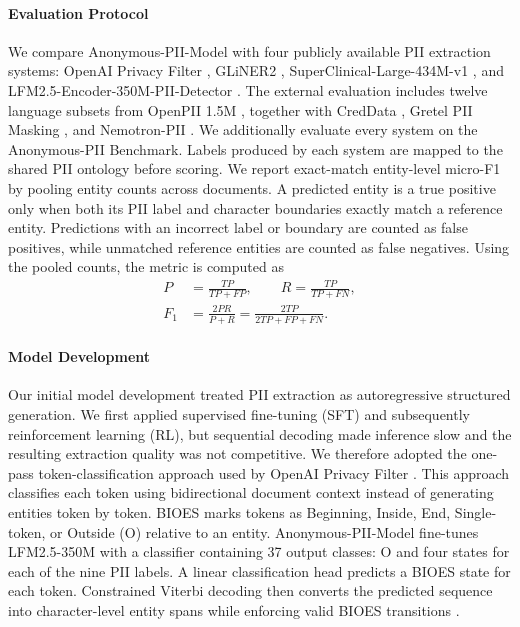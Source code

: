 \documentclass[11pt]{article}
\begin{document}
\paragraph{Evaluation Protocol} We compare Anonymous-PII-Model with four publicly available PII extraction systems: OpenAI Privacy Filter \cite{openai2026privacyfilter}, GLiNER2 \cite{zaratiana2025gliner2efficientmultitaskinformation}, SuperClinical-Large-434M-v1 \cite{openmed-pii-2026}, and LFM2.5-Encoder-350M-PII-Detector \cite{liquidai2026lfm25pii}. The external evaluation includes twelve language subsets from OpenPII 1.5M \cite{ai4privacy_openpii_1_5m_2026}, together with CredData \cite{sr-cred21}, Gretel PII Masking \cite{gretel-pii-docs-en-v1}, and Nemotron-PII \cite{nemotron-pii}. We additionally evaluate every system on the Anonymous-PII Benchmark. Labels produced by each system are mapped to the shared PII ontology before scoring. We report exact-match entity-level micro-F1 by pooling entity counts across documents. A predicted entity is a true positive only when both its PII label and character boundaries exactly match a reference entity. Predictions with an incorrect label or boundary are counted as false positives, while unmatched reference entities are counted as false negatives. Using the pooled counts, the metric is computed as
\begin{equation}
\begin{aligned}
P &= \frac{TP}{TP+FP}, \qquad
R = \frac{TP}{TP+FN}, \\
F_1 &= \frac{2PR}{P+R}
= \frac{2TP}{2TP+FP+FN}.
\end{aligned}
\end{equation}

\paragraph{Model Development} Our initial model development treated PII extraction as autoregressive structured generation. We first applied supervised fine-tuning (SFT) and subsequently reinforcement learning (RL), but sequential decoding made inference slow and the resulting extraction quality was not competitive. We therefore adopted the one-pass token-classification approach used by OpenAI Privacy Filter \cite{openai2026privacyfilter}. This approach classifies each token using bidirectional document context instead of generating entities token by token. BIOES marks tokens as Beginning, Inside, End, Single-token, or Outside (O) relative to an entity. Anonymous-PII-Model fine-tunes LFM2.5-350M with a classifier containing 37 output classes: O and four states for each of the nine PII labels. A linear classification head predicts a BIOES state for each token. Constrained Viterbi decoding then converts the predicted sequence into character-level entity spans while enforcing valid BIOES transitions \cite{lester-etal-2020-constrained}.
\end{document}
